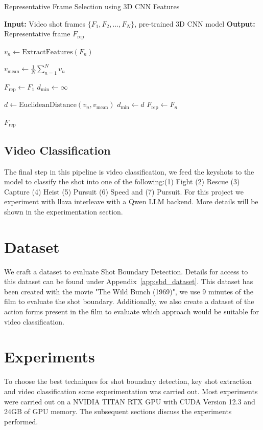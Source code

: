 \documentclass[12pt]{report}
\begin{document}
\begin{algorithm}
	\caption{Representative Frame Selection using 3D CNN Features \cite{telnet}}
	\label{alg:rep-frame-selection}
	\begin{algorithmic}[1]
		\State \textbf{Input:} Video shot frames $\{F_1, F_2, ..., F_N\}$, pre-trained 3D CNN model
		\State \textbf{Output:} Representative frame $F_{\text{rep}}$
		
		 
		\State $v_n \gets \text{ExtractFeatures}(F_n)$ 
		\EndFor
		
		\State $v_{\text{mean}} \gets \frac{1}{N} \sum_{n=1}^{N} v_n$ 
		
		\State $F_{\text{rep}} \gets F_1$  
		\State $d_{\text{min}} \gets \infty$ 
		
		 
		\State $d \gets \text{EuclideanDistance}(v_n, v_{\text{mean}})$
		\State $d_{\text{min}} \gets d$
		\State $F_{\text{rep}} \gets F_n$
		\EndIf
		\EndFor
		
		\State \Return $F_{\text{rep}}$
	\end{algorithmic}
\end{algorithm}
	\subsection{Video Classification}
	The final step in this pipeline is video classification, we feed the keyshots to the model to classify the shot into one of the following:(1) Fight (2) Rescue (3) Capture (4) Heist (5) Pursuit (6) Speed and (7) Pursuit. For this project we experiment with llava interleave \cite{llava} with a Qwen LLM backend. More details will be shown in the experimentation section.
	\section{Dataset}
	We craft a dataset to evaluate Shot Boundary Detection. Details for access to this dataset can be found under Appendix~\ref{app:sbd_dataset}. This dataset has been created with the movie "The Wild Bunch (1969)", we use 9 minutes of the film to evaluate the shot boundary. Additionally, we also create a dataset of the action forms present in the film to evaluate which approach would be suitable for video classification.
	\section{Experiments}
	To choose the best techniques for shot boundary detection, key shot extraction and video classification some experimentation was carried out. Most experiments were carried out on a NVIDIA TITAN RTX GPU with CUDA Version 12.3 and 24GB of GPU memory. The subsequent sections discuss the experiments performed.
\end{document}
